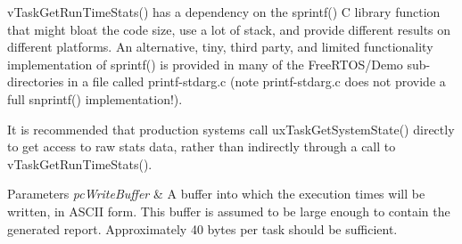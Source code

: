 v\+Task\+Get\+Run\+Time\+Stats() has a dependency on the sprintf() C library function that might bloat the code size, use a lot of stack, and provide different results on different platforms. An alternative, tiny, third party, and limited functionality implementation of sprintf() is provided in many of the Free\+R\+T\+O\+S/\+Demo sub-\/directories in a file called printf-\/stdarg.\+c (note printf-\/stdarg.\+c does not provide a full snprintf() implementation!).

It is recommended that production systems call ux\+Task\+Get\+System\+State() directly to get access to raw stats data, rather than indirectly through a call to v\+Task\+Get\+Run\+Time\+Stats().


\begin{DoxyParams}{Parameters}
{\em pc\+Write\+Buffer} & A buffer into which the execution times will be written, in A\+S\+C\+II form. This buffer is assumed to be large enough to contain the generated report. Approximately 40 bytes per task should be sufficient. \\
\hline
\end{DoxyParams}
